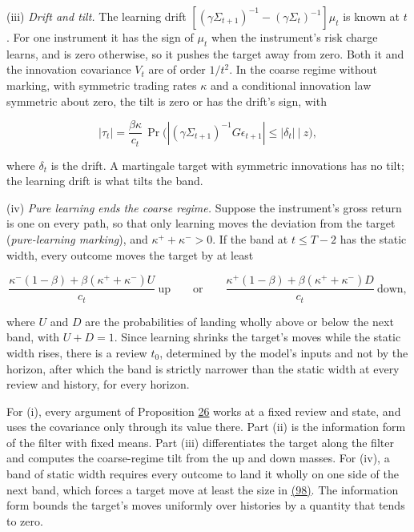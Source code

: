 \documentclass[11pt]{article}
\begin{document}
(iii) \emph{Drift and tilt.} The learning drift
\([(\gamma\Sigma_{t+1})^{-1}-(\gamma\Sigma_t)^{-1}]\mu_t\) is known at \(t\). For one
instrument it has the sign of \(\mu_t\) when the instrument's risk charge
learns, and is zero otherwise, so it pushes the target away from
zero. Both it and the innovation covariance \(V_t\) are of order
\(1/t^2\). In the coarse regime without marking, with symmetric trading
rates \(\kappa\) and a conditional innovation law symmetric about zero,
the tilt is zero or has the drift's sign, with

\begin{equation*}
|\tau_t|=\frac{\beta\kappa}{c_t}\,
 \Pr\bigl(|(\gamma\Sigma_{t+1})^{-1}G\epsilon_{t+1}|\leq|\delta_t|\ \big|\ z\bigr),\tag{97}\label{eq:97}
\end{equation*}

where \(\delta_t\) is the drift. A martingale target with symmetric
innovations has no tilt; the learning drift is what tilts the band.

(iv) \emph{Pure learning ends the coarse regime.} Suppose the instrument's
gross return is one on every path, so that only learning moves the
deviation from the target (\emph{pure-learning marking}), and
\(\kappa^++\kappa^->0\). If the band at \(t\leq T-2\) has the static width, every
outcome moves the target by at least

\begin{equation*}
\frac{\kappa^-(1-\beta)+\beta(\kappa^++\kappa^-)U}{c_t}\ \text{up}
\qquad\text{or}\qquad
\frac{\kappa^+(1-\beta)+\beta(\kappa^++\kappa^-)D}{c_t}\ \text{down},\tag{98}\label{eq:98}
\end{equation*}

where \(U\) and \(D\) are the probabilities of landing wholly above or
below the next band, with \(U+D=1\). Since learning shrinks the target's
moves while the static width rises, there is a review \(t_0\),
determined by the model's inputs and not by the horizon, after which
the band is strictly narrower than the static width at every review
and history, for every horizon.

For (i), every argument of Proposition \hyperref[res:Proposition-26]{26} works at a fixed review and
state, and uses the covariance only through its value there. Part
(ii) is the information form of the filter with fixed means. Part
(iii) differentiates the target along the filter and computes the
coarse-regime tilt from the up and down masses. For (iv), a band of
static width requires every outcome to land it wholly on one side of
the next band, which forces a target move at least the size in \hyperref[eq:98]{(98)}.
The information form bounds the target's moves uniformly over
histories by a quantity that tends to zero.
\end{document}

